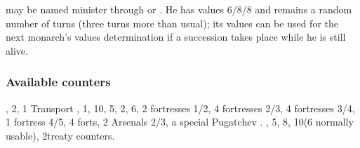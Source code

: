  may be named minister through
 or . He has values
6/8/8 and remains a random number of turns (three turns more than
usual); its values can be used for the next monarch's values
determination if a succession takes place while he is still alive.

\subsubsection{Available counters}
\ARMY, 2\FLEET, 1 Transport \FLEET, 1\corsaire,
10\LDND, 5\LD, 2\NTD, 6\LDENDE, 2 fortresses 1/2, 4 fortresses 2/3, 4
fortresses 3/4, 1 fortress 4/5, 4 forts, 2 Arsenals 2/3,
a special Pugatchev \ARMY.
\COL, 5\TP, 8\MNU, 10\TradeFLEET (6 normally
usable), 2\ROTW treaty counters.

